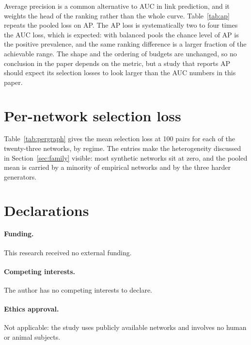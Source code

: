 \documentclass{comjnl}
\begin{document}

Average precision is a common alternative to AUC in link prediction, and it weights the head of the
ranking rather than the whole curve. Table~\ref{tab:ap} repeats the pooled loss on AP. The AP loss is
systematically two to four times the AUC loss, which is expected: with balanced pools the chance
level of AP is the positive prevalence, and the same ranking difference is a larger fraction of the
achievable range. The shape and the ordering of budgets are unchanged, so no conclusion in the paper
depends on the metric, but a study that reports AP should expect its selection losses to look larger
than the AUC numbers in this paper.

\section{Per-network selection loss}
\label{app:pergraph}

Table~\ref{tab:pergraph} gives the mean selection loss at 100 pairs for each of the twenty-three networks, by regime. The entries make the heterogeneity discussed in Section~\ref{sec:family} visible: most synthetic networks sit at zero, and the pooled mean is carried by a minority of empirical networks and by the three harder generators.


\section*{Declarations}

\paragraph{Funding.} This research received no external funding.

\paragraph{Competing interests.} The author has no competing interests to declare.

\paragraph{Ethics approval.} Not applicable: the study uses publicly available networks and involves no human or animal subjects.
\end{document}
